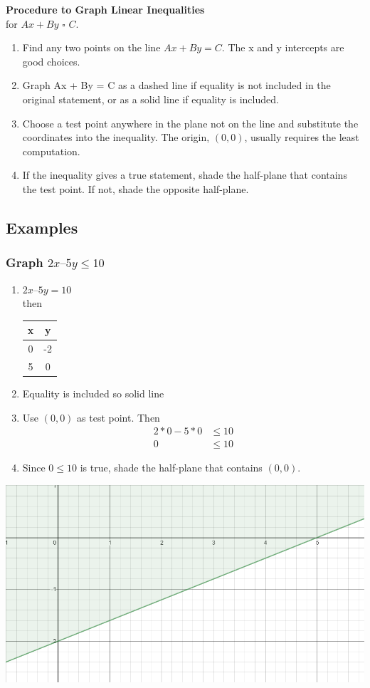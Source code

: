 \documentclass[14pt]{extarticle}
\begin{document}
\begin{tcolorbox}[enhanced jigsaw,colback=bg,boxrule=0pt,arc=0pt]
	\textbf{Procedure to Graph Linear Inequalities}\\
	for $Ax + By$ $\square$ $C$.
	\begin{enumerate}
		\item Find any two points on the line  $Ax + By = C$. The x and y intercepts are good choices.
		\item Graph Ax + By = C as a dashed line if equality is not included in the original statement, or as a solid line if equality is included.
		\item Choose a test point anywhere in the plane not on the line and substitute the coordinates into the inequality. The origin, $(0, 0)$, usually requires the least computation.
		\item If the inequality gives a true statement, shade the half-plane that contains the test point. If not, shade the opposite half-plane.
	\end{enumerate}
\end{tcolorbox}


\subsection{Examples}
\subsubsection*{Graph $2x – 5y \leq 10$}
\begin{enumerate}
	\item $2x – 5y = 10$ \\ then 
	\begin{tabular}{c|c}
		x & y \\
		\hline
		0 & -2 \\
		5 & 0 \\
	\end{tabular}
	\item Equality is included so solid line
	\item Use $(0,0)$ as test point. Then 
	\begin{align*}
		2*0 -5*0 &\leq 10 \\
		0 &\leq 10
	\end{align*}
	\item Since $0 \leq 10$ is true, shade the half-plane that contains $(0,0)$.
\end{enumerate}
\begin{center}\includegraphics[width=0.5\linewidth]{5-1-1}\end{center}
\end{document}
